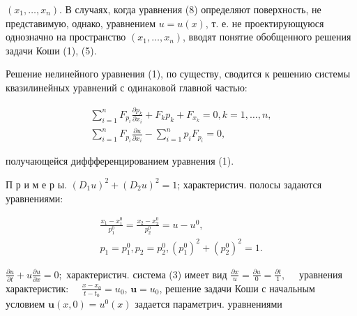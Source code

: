 \documentclass[10pt]{article}
\begin{document}
$\left(x_{1}, \ldots, x_{n}\right)$. В случаях, когда уравнения (8) определяют поверхность, не представимую, однако, уравнением $u=u(x)$, т. е. не проектирующуюся однозначно на пространство $\left(x_{1}, \ldots, x_{n}\right)$, вводят понятие обобщенного решения задачи Коши (1), (5).



Решение нелинейного уравнения (1), по существу, сводится к решению системы квазилинейных уравнений с одинаковой главной частью:



\[

\begin{gathered}

\sum_{i=1}^{n} F_{p_{i}} \frac{\partial p_{k}}{\partial x_{i}}+F_{k} p_{k}+F_{x_{k}}=0, k=1, \ldots, n, \\

\sum_{i=1}^{n} F_{p_{i}} \frac{\partial u}{\partial x_{i}}-\sum_{i=1}^{n} p_{i} F_{p_{i}}=0,

\end{gathered}

\]



получающейся диффференцированием уравнения (1).



П р и м е р ы. $\left(D_{1} u\right)^{2}+\left(D_{2} u\right)^{2}=1$; характеристич. полосы задаются уравнениями:



\[

\begin{gathered}

\frac{x_{1}-x_{1}^{0}}{p_{1}^{0}}=\frac{x_{2}-x_{2}^{0}}{p_{2}^{0}}=u-u^{0}, \\

p_{1}=p_{1}^{0}, p_{2}=p_{2}^{0},\left(p_{1}^{0}\right)^{2}+\left(p_{2}^{0}\right)^{2}=1 .

\end{gathered}

\]



$\frac{\partial u}{\partial t}+u \frac{\partial u}{\partial x}=0 ;$ характеристич. система (3) имеет вид $\frac{\partial x}{u}=\frac{\partial u}{0}=\frac{\partial t}{1}, \quad$ уравнения $\quad$ характеристик: $\quad \frac{x-x_{0}}{t-t_{0}}=u_{0}$, $\boldsymbol{u}=u_{0}$, решение задачи Коши с начальным условием $\boldsymbol{u}(x, 0)=u^{0}(x)$ задается параметрич. уравнениями
\end{document}
